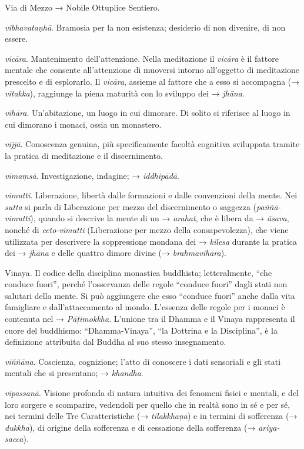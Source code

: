 Via di Mezzo → Nobile Ottuplice Sentiero.

\emph{vibhavataṇhā}. Bramosia per la non esistenza; desiderio di non
divenire, di non essere.

\emph{vicāra}. Mantenimento dell'attenzione. Nella meditazione il
\emph{vicāra} è il fattore mentale che consente all'attenzione di
muoversi intorno all'oggetto di meditazione prescelto e di esplorarlo.
Il \emph{vicāra}, assieme al fattore che a esso si accompagna (→
\emph{vitakka}), raggiunge la piena maturità con lo sviluppo dei →
\emph{jhāna}.

\emph{vihāra}. Un'abitazione, un luogo in cui dimorare. Di solito si
riferisce al luogo in cui dimorano i monaci, ossia un monastero.

\emph{vijjā}. Conoscenza genuina, più specificamente facoltà cognitiva
sviluppata tramite la pratica di meditazione e il discernimento.

\emph{vīmaṃsā}. Investigazione, indagine; → \emph{iddhipādā}.

\emph{vimutti}. Liberazione, libertà dalle formazioni e dalle
convenzioni della mente. Nei \emph{sutta} si parla di Liberazione per
mezzo del discernimento o saggezza (\emph{paññā-vimutti}), quando si
descrive la mente di un → \emph{arahat}, che è libera da → \emph{āsava},
nonché di \emph{ceto-vimutti} (Liberazione per mezzo della
consapevolezza), che viene utilizzata per descrivere la soppressione
mondana dei → \emph{kilesa} durante la pratica dei → \emph{jhāna} e
delle quattro dimore divine (→ \emph{brahmavihāra}).

Vinaya. Il codice della disciplina monastica buddhista; letteralmente,
``che conduce fuori'', perché l'osservanza delle regole ``conduce
fuori'' dagli stati non salutari della mente. Si può aggiungere che esso
``conduce fuori'' anche dalla vita famigliare e dall'attaccamento al
mondo. L'essenza delle regole per i monaci è contenuta nel →
\emph{Pāṭimokkha}. L'unione tra il Dhamma e il Vinaya rappresenta il
cuore del buddhismo: ``Dhamma-Vinaya'', ``la Dottrina e la Disciplina'',
è la definizione attribuita dal Buddha al suo stesso insegnamento.

\emph{viññāna}. Coscienza, cognizione; l'atto di conoscere i dati
sensoriali e gli stati mentali che si presentano; → \emph{khandha}.

\emph{vipassanā}. Visione profonda di natura intuitiva dei fenomeni
fisici e mentali, e del loro sorgere e scomparire, vedendoli per quello
che in realtà sono in sé e per sé, nei termini delle Tre Caratteristiche
(→ \emph{tilakkhaṇa}) e in termini di sofferenza (→ \emph{dukkha}), di
origine della sofferenza e di cessazione della sofferenza (→
\emph{ariya-sacca}).

